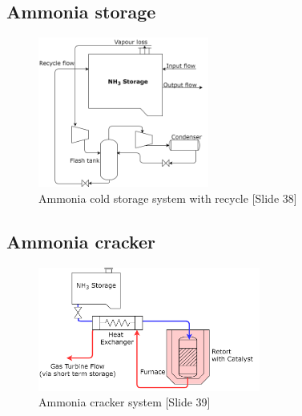             \subsection{Ammonia storage}

 \begin{figure}[H]
        \centering
        \includegraphics[width=0.5\textwidth]{ammoniasynth/handout/graphics/store.png}
        \caption{Ammonia cold storage system with recycle [Slide 38]}
        \label{fig:store}
    \end{figure}
    
    
        \subsection{Ammonia cracker}
        
 \begin{figure}[H]
        \centering
        \includegraphics[width=0.65\textwidth]{ammoniasynth/handout/graphics/crack.png}
        \caption{Ammonia cracker system [Slide 39]}
        \label{fig:crack}
    \end{figure}
    
    
    \newpage
    


%